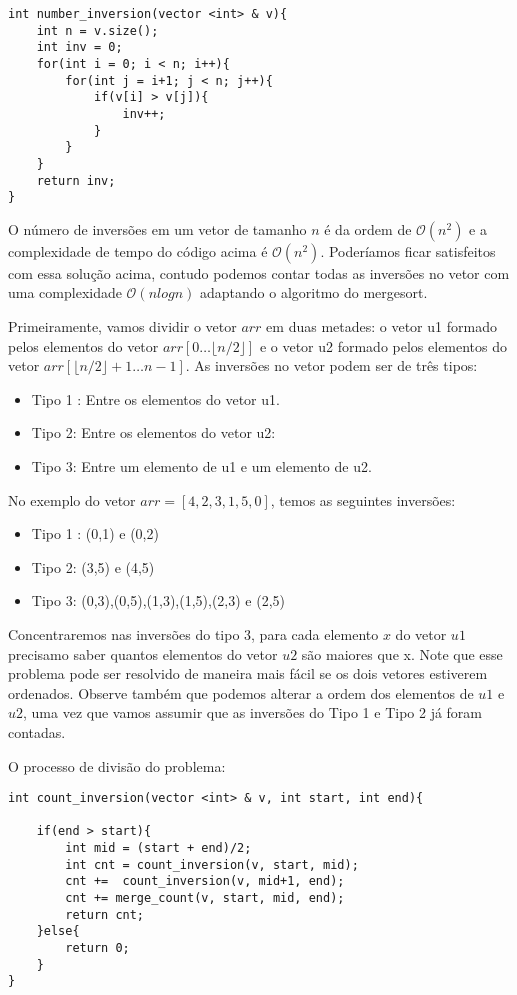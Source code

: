 \begin{verbatim}
int number_inversion(vector <int> & v){
    int n = v.size();
    int inv = 0;
    for(int i = 0; i < n; i++){
        for(int j = i+1; j < n; j++){
            if(v[i] > v[j]){
                inv++;
            }
        }
    }
    return inv;
}
\end{verbatim}

O número de inversões em um vetor de tamanho $n$ é da ordem de $\mathcal{O}(n^2)$ e a complexidade de tempo do código acima é $\mathcal{O}(n^2)$. Poderíamos ficar satisfeitos com essa solução acima, contudo podemos contar todas as inversões no vetor com uma complexidade $\mathcal{O}(n log n)$ adaptando o algoritmo do mergesort.

Primeiramente, vamos dividir o vetor $arr$ em duas metades: o vetor u1 formado pelos elementos do vetor $arr[0 \ldots \lfloor n/2 \rfloor ]$ e o vetor u2 formado pelos elementos do vetor  $arr[ \lfloor n/2 \rfloor + 1 \ldots n-1]$. As inversões no vetor podem ser de três tipos:

\begin{itemize}
\item Tipo 1 : Entre os elementos do vetor u1.
\item Tipo 2: Entre os elementos do vetor u2:
\item Tipo 3: Entre um elemento de u1 e um elemento de u2.
\end{itemize}

No exemplo do vetor  $arr = [4,2,3,1,5,0]$, temos as seguintes inversões:

\begin{itemize}
\item Tipo 1 : (0,1) e (0,2)
\item Tipo 2: (3,5) e (4,5)
\item Tipo 3: (0,3),(0,5),(1,3),(1,5),(2,3) e (2,5)
\end{itemize}

Concentraremos nas inversões do tipo 3, para cada elemento $x$ do vetor $u1$ precisamo saber quantos elementos do vetor $u2$ são maiores que x. Note que esse problema pode ser resolvido de maneira mais fácil se os dois vetores estiverem ordenados. Observe também que podemos alterar a ordem dos elementos de $u1$ e $u2$, uma vez que vamos assumir que as inversões do Tipo 1 e Tipo 2 já foram contadas. 


O processo de divisão do problema:

\begin{verbatim}
int count_inversion(vector <int> & v, int start, int end){

    if(end > start){
        int mid = (start + end)/2;
        int cnt = count_inversion(v, start, mid);
        cnt +=  count_inversion(v, mid+1, end);
        cnt += merge_count(v, start, mid, end);
        return cnt;
    }else{
        return 0;
    }
}
\end{verbatim}


